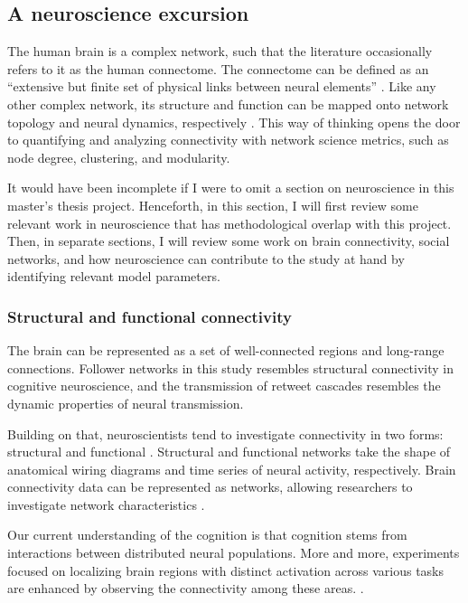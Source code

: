 \documentclass[11pt,a4paper]{article}
\begin{document}
    \subsection{A neuroscience excursion}
    The human brain is a complex network, such that the literature occasionally refers to it as the human connectome. The connectome can be defined as an “extensive but finite set of physical links between neural elements” \cite{sporns_human_2011}. Like any other complex network, its structure and function can be mapped onto network topology and neural dynamics, respectively \cite{sporns_human_2011}. This way of thinking opens the door to quantifying and analyzing connectivity with network science metrics, such as node degree, clustering, and modularity.
    
    It would have been incomplete if I were to omit a section on neuroscience in this master's thesis project. Henceforth, in this section, I will first review some relevant work in neuroscience that has methodological overlap with this project. Then, in separate sections, I will review some work on brain connectivity, social networks, and how neuroscience can contribute to the study at hand by identifying relevant model parameters.
    
        \subsubsection{Structural and functional connectivity}

        The brain can be represented as a set of well-connected regions and long-range connections. Follower networks in this study resembles structural connectivity in cognitive neuroscience, and the transmission of retweet cascades resembles the dynamic properties of neural transmission. 
        
        Building on that, neuroscientists tend to investigate connectivity in two forms: structural and functional \cite{horwitz_elusive_2003,sporns_contributions_2014}. Structural and functional networks take the shape of anatomical wiring diagrams and time series of neural activity, respectively. Brain connectivity data can be represented as networks, allowing researchers to investigate network characteristics \cite{bullmore_complex_2009,fornito_graph_2013}. 
        
        Our current understanding of the cognition is that cognition stems from interactions between distributed neural populations. More and more, experiments focused on localizing brain regions with distinct activation across various tasks are enhanced by observing the connectivity among these areas. \cite{sporns_contributions_2014}.
        
\end{document}
